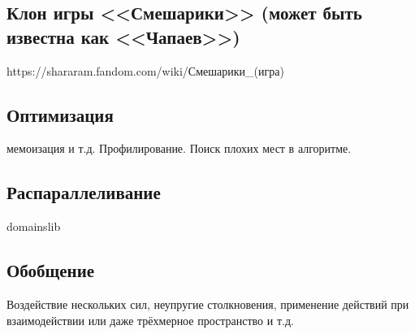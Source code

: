\subsection{Клон игры <<Смешарики>> (может быть известна как <<Чапаев>>)}

\TODO https://shararam.fandom.com/wiki/Смешарики\_(игра)

\subsection{Оптимизация}

\TODO мемоизация и т.д.
Профилирование. Поиск плохих мест в алгоритме.

\subsection{Распараллеливание}

\TODO domainslib

\subsection{Обобщение \TODO}

\TODO Воздействие нескольких сил, неупругие столкновения,
применение действий при взаимодействии или даже трёхмерное пространство и т.д.


\TODO

